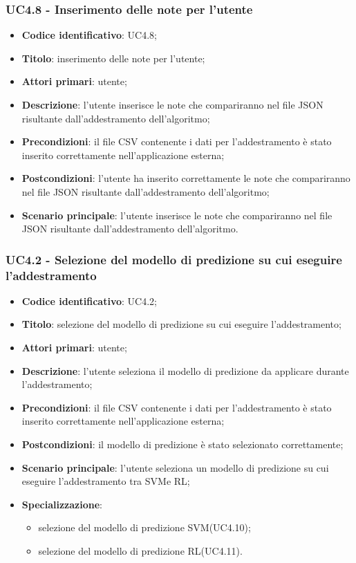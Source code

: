 \subsubsection{UC4.8 - Inserimento delle note per l'utente}
\begin{itemize}
	\item \textbf{Codice identificativo}: UC4.8;
	\item \textbf{Titolo}: inserimento delle note per l'utente;
	\item \textbf{Attori primari}: utente;
	\item \textbf{Descrizione}: l'utente inserisce le note che compariranno nel file JSON risultante dall'addestramento dell'algoritmo;
	\item \textbf{Precondizioni}: il file CSV contenente i dati per l'addestramento è stato inserito correttamente nell'applicazione esterna;
	\item \textbf{Postcondizioni}: l'utente ha inserito correttamente le note che compariranno nel file JSON risultante dall'addestramento dell'algoritmo;
	\item \textbf{Scenario principale}: l'utente inserisce le note che compariranno nel file JSON risultante dall'addestramento dell'algoritmo.
\end{itemize}
\subsubsection{UC4.2 - Selezione del modello di predizione su cui eseguire l'addestramento}
\begin{itemize}
    \item \textbf{Codice identificativo}: UC4.2;
    \item \textbf{Titolo}: selezione del modello di predizione su cui eseguire l'addestramento;
    \item \textbf{Attori primari}: utente;
    \item \textbf{Descrizione}: l'utente seleziona il modello di predizione da applicare durante l'addestramento;
    \item \textbf{Precondizioni}: il file CSV contenente i dati per l'addestramento è stato inserito correttamente nell'applicazione esterna;
    \item \textbf{Postcondizioni}: il modello di predizione è stato selezionato correttamente;
    \item \textbf{Scenario principale}: l'utente seleziona un modello di predizione su cui eseguire l'addestramento tra SVM\glosp e RL\glo;
    \item \textbf{Specializzazione}:
    \begin{itemize}
    	\item selezione del modello di predizione SVM\glosp (UC4.10);
    	\item selezione del modello di predizione RL\glosp (UC4.11).
    \end{itemize}   
\end{itemize}
